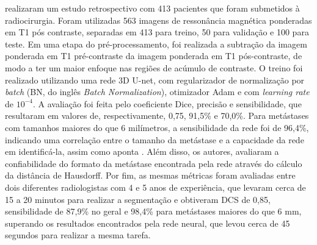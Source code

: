 \cite{Rudie:2021} realizaram um estudo retrospectivo com 413 pacientes que foram submetidos à radiocirurgia. Foram utilizadas 563 imagens de ressonância magnética ponderadas em T1 pós contraste, separadas em 413 para treino, 50 para validação e 100 para teste. Em uma etapa do pré-processamento, foi realizada a subtração da imagem ponderada em T1 pré-contraste da imagem ponderada em T1 pós-contraste, de modo a ter um maior enfoque nas regiões de acúmulo de contraste. O treino foi realizado utilizando uma rede 3D U-net, com regularizador de normalização por \textit{batch} (BN, do inglês \textit{Batch Normalization}), otimizador Adam e com \textit{learning rate} de $10^{-4}$. A avaliação foi feita pelo coeficiente Dice, precisão e sensibilidade, que resultaram em valores de, respectivamente, 0,75, 91,5\% e 70,0\%. Para metástases com tamanhos maiores do que 6 milímetros, a sensibilidade da rede foi de 96,4\%, indicando uma correlação entre o tamanho da metástase e a capacidade da rede em identificá-la, assim como aponta \cite{Hu:2019}. Além disso, os autores, avaliaram a confiabilidade do formato da metástase encontrada pela rede através do cálculo da distância de Hausdorff. Por fim, as mesmas métricas foram avaliadas entre dois diferentes radiologistas com 4 e 5 anos de experiência, que levaram cerca de 15 a 20 minutos para realizar a segmentação e obtiveram DCS de 0,85, sensibilidade de 87,9\% no geral e 98,4\% para metástases maiores do que 6 mm, superando os resultados encontrados pela rede neural, que levou cerca de 45 segundos para realizar a mesma tarefa.

